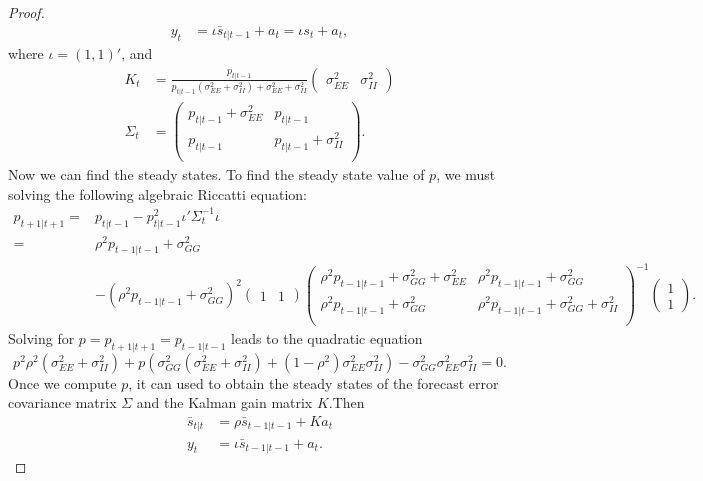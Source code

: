 \documentclass[oneside,reqno]{amsart}
\theoremstyle{definition}
\begin{document}
\begin{enumerate}[label=(\roman*)]
\begin{proof}
\begin{align*}
	y_t &= \iota \bar s_{t|t-1} + a_t = \iota s_t + a_t,
\end{align*}
where $\iota = (1,1)'$, and 
\begin{align*}
	K_t &= \frac{p_{t|t-1}}{p_{t|t-1}(\sigma_{EE}^2 + \sigma_{II}^2) + \sigma_{EE}^2 + \sigma_{II}^2} \begin{pmatrix} \sigma_{EE}^2 & \sigma_{II}^2 \end{pmatrix} \\
	\Sigma_t &= \begin{pmatrix}
			p_{t|t-1} + \sigma_{EE}^2 & p_{t|t-1} \\
			p_{t|t-1}  & p_{t|t-1} + \sigma_{II}^2 \\
		\end{pmatrix}.
\end{align*}
Now we can find the steady states. To find the steady state value of $p$, we must solving the following algebraic Riccatti equation: 
\begin{align*}
	p_{t+1|t+1} ={}& p_{t|t-1} - p_{t|t-1}^2 \iota' \Sigma_t^{-1} \iota \\
	={}& \rho^2 p_{t-1|t-1} + \sigma_{GG}^2 \\
	&- (\rho^2 p_{t-1|t-1} + \sigma_{GG}^2)^2 
	\begin{pmatrix} 1 & 1 \end{pmatrix}   
	    \begin{pmatrix}
		\rho^2 p_{t-1|t-1} + \sigma_{GG}^2 + \sigma_{EE}^2 & \rho^2 p_{t-1|t-1} + \sigma_{GG}^2 \\
		\rho^2 p_{t-1|t-1} + \sigma_{GG}^2  & \rho^2 p_{t-1|t-1} + \sigma_{GG}^2 + \sigma_{II}^2 \\
		\end{pmatrix}^{-1}
	\begin{pmatrix} 1 \\ 1 \end{pmatrix}.
\end{align*}
Solving for $p = p_{t+1|t+1}= p_{t-1|t-1}$ leads to the quadratic equation
\[
	p^2 \rho^2 (\sigma_{EE}^2 + \sigma_{II}^2) + p \left(\sigma_{GG}^2(\sigma_{EE}^2 + \sigma_{II}^2) + (1-\rho^2)\sigma_{EE}^2\sigma_{II}^2 \right) - \sigma_{GG}^2\sigma_{EE}^2\sigma_{II}^2 = 0.
\]
Once we compute $p$, it can used to obtain the steady states of the forecast error covariance matrix $\Sigma$ and the Kalman gain matrix $K$.Then 
\begin{align*}
	\bar s_{t|t} &= \rho \bar s_{t-1|t-1} + Ka_t \\
	y_t &= \iota \bar s_{t-1|t-1} + a_t.
\end{align*}

\end{proof}
\end{enumerate}
\end{document}
